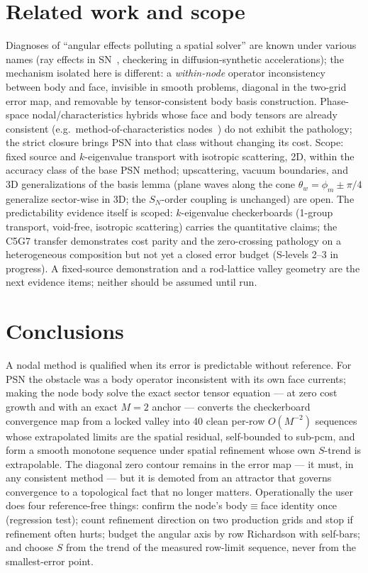 \documentclass[11pt,a4paper]{article}
\begin{document}
\section{Related work and scope}
Diagnoses of ``angular effects polluting a spatial solver'' are known
under various names (ray effects in SN~\cite{lewis1993}, checkering in
diffusion-synthetic accelerations); the mechanism isolated here is
different: a \emph{within-node} operator inconsistency between body
and face, invisible in smooth problems, diagonal in the two-grid
error map, and removable by tensor-consistent body basis construction.
Phase-space nodal/characteristics hybrids whose face and body tensors
are already consistent (e.g.\ method-of-characteristics
nodes~\cite{askew2012}) do not exhibit the pathology; the strict
closure brings PSN into that class without changing its cost.  Scope:
fixed source and $k$-eigenvalue transport with isotropic scattering,
2D, within the accuracy class of the base PSN method; upscattering,
vacuum boundaries, and 3D generalizations of the basis lemma
(plane waves along the cone $\theta_w = \phi_m \pm \pi/4$ generalize
sector-wise in 3D; the $S_N$-order coupling is unchanged) are
open.  The predictability evidence itself is scoped: $k$-eigenvalue
checkerboards (1-group transport, void-free, isotropic scattering)
carries the quantitative claims; the C5G7 transfer demonstrates cost
parity and the zero-crossing pathology on a heterogeneous composition
but not yet a closed error budget (S-levels 2--3 in progress).  A
fixed-source demonstration and a rod-lattice valley geometry are the
next evidence items; neither should be assumed until run.

\section{Conclusions}
A nodal method is qualified when its error is predictable without
reference.  For PSN the obstacle was a body operator inconsistent with
its own face currents; making the node body solve the exact sector
tensor equation --- at zero cost growth and with an exact $M{=}2$
anchor --- converts the checkerboard convergence map from a locked
valley into 40 clean per-row $O(M^{-2})$ sequences whose extrapolated
limits are the spatial residual, self-bounded to sub-pcm, and form a
smooth monotone sequence under spatial refinement whose own $S$-trend
is extrapolable.  The diagonal zero contour
remains in the error map --- it must, in any consistent method --- but
it is demoted from an attractor that governs convergence to a
topological fact that no longer matters.  Operationally the user
does four reference-free things: confirm the node's
body$\equiv$face identity once (regression test); count refinement
direction on two production grids and stop if refinement often
hurts; budget the angular axis by row Richardson with self-bars;
and choose $S$ from the trend of the measured row-limit sequence,
never from the smallest-error point.
\end{document}
